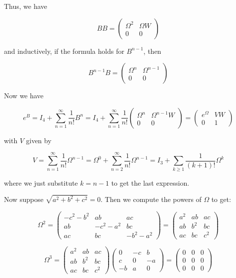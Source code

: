 \documentclass{article}
\begin{document}
Thus, we have 

\[ BB = \left( \begin{array}{cc} \Omega^2 & \Omega W \\ 0 & 0 \end{array}\right)\]

and inductively, if the formula holds for $B^{n-1}$, then

\[ B^{n-1} B = \left(\begin{array}{cc} \Omega^n & \Omega^{n-1} \\ 0 & 0 \end{array}\right) \]

Now we have 

\[ e^B = I_4 + \displaystyle\sum_{n=1}^{\infty} \dfrac{1}{n!} B^n = I_4 + \displaystyle\sum_{n=1}^{\infty} \dfrac{1}{n!} \left(\begin{array}{cc} \Omega^n & \Omega^{n-1}W \\ 0 & 0 \end{array}\right) = \left( \begin{array}{cc} e^{\Omega} & VW \\ 0 & 1 \end{array}\right)\]

with $V$ given by

\[V = \displaystyle\sum_{n=1}^{\infty} \dfrac{1}{n!} \Omega^{n-1} = \Omega^0  + \displaystyle\sum_{n=2}^{\infty} \dfrac{1}{n!} \Omega^{n-1} = I_3 + \displaystyle\sum_{k\ge 1} \dfrac{1}{(k+1)!} \Omega^k\]

where we just substitute $k=n-1$ to get the last expression. 

Now suppose $\sqrt{a^2 + b^2 + c^2} = 0$. Then we compute the powers of $\Omega$ to get: 

\[ \Omega^2 = \left(\begin{array}{ccc} -c^2 - b^2 & ab & ac \\ ab & -c^2 - a^2 & bc \\ ac & bc & -b^2 - a^2 \end{array}\right) = \left(\begin{array}{ccc} a^2 & ab & ac \\ ab & b^2 & bc \\ ac & bc & c^2 \end{array}\right) \]

\[ \Omega^3 = \left(\begin{array}{ccc} a^2 & ab & ac \\ ab & b^2 & bc \\ ac & bc & c^2 \end{array}\right) \left(\begin{array}{ccc} 0 & -c & b \\ c & 0 & -a \\ -b & a & 0 \end{array}\right) = \left(\begin{array}{ccc} 0 & 0 & 0 \\ 0 & 0 & 0 \\ 0 & 0 & 0 \end{array}\right) \]
\end{document}
